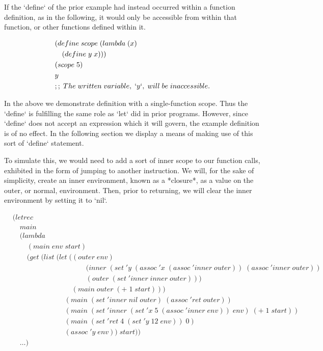If the `define` of the prior example had instead occurred within a function definition, 
as in the following, it would only be accessible from within that function, or other 
functions defined within it.

\begin{align*}
& (define \; scope \; (lambda \; (x)
\\& \quad (define \; y \; x)))
\\& (scope \; 5)
\\& y
\\& ;; \; The \; written \; variable, \; `y`, \; will \; be \; inaccessible.
\end{align*}

In the above we demonstrate definition with a single-function scope. Thus the 
`define` is fulfilling the same role as `let` did in prior programs. However, since 
`define` does not accept an expression which it will govern, the example definition 
is of no effect. In the following section we display a means of making use of this 
sort of `define` statement.

To simulate this, we would need to add a sort of inner scope to our function calls, 
exhibited in the form of jumping to another instruction. We will, for the sake of
simplicity, create an inner environment, known as a *closure*, as a value on the
outer, or normal, environment. Then, prior to returning, we will clear the inner 
environment by setting it to `nil`.

\begin{align*}
& (letrec \; 
\\& \quad main \; 
\\& \quad (lambda \; 
\\& \qquad (main \; env \; start)
\\& \qquad (get \; (list \; (let \; ((outer \; env)
\\& \qquad \qquad \qquad \qquad \qquad \; (inner \; (set \; 'y \; (assoc \; 'x \; (assoc \; 'inner \; outer)) \; (assoc \; 'inner \; outer))
\\& \qquad \qquad \qquad \qquad \qquad \; (outer \; (set \; 'inner \; inner \; outer)))
\\& \qquad \qquad \qquad \qquad \; (main \; outer \; (+ \; 1 \; start)))
\\& \qquad \qquad \qquad \quad \; (main \; (set \; 'inner \; nil \; outer) \; (assoc \; 'ret \; outer))
\\& \qquad \qquad \qquad \quad \; (main \; (set \; 'inner \; (set \; 'x \; 5 \; (assoc \; 'inner \; env)) \; env) \; (+ \; 1 \; start))
\\& \qquad \qquad \qquad \quad \; (main \; (set \; 'ret \; 4 \; (set \; 'y \; 12 \; env)) \; 0)
\\& \qquad \qquad \qquad \quad \; (assoc \; 'y \; env)) \; start))
\\& \quad \dots)
\end{align*}

